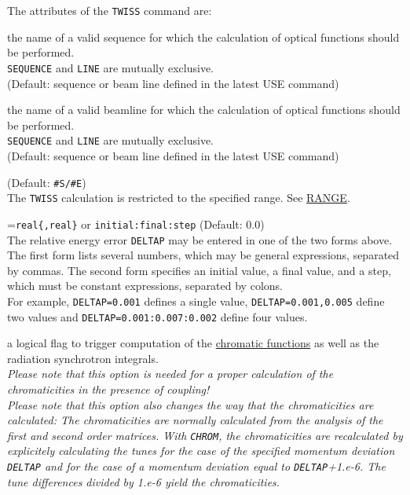 The  attributes of the {\tt TWISS} command are: 
\begin{madlist}
   the name of a valid sequence for
  which the calculation of optical functions should be performed. \\ 
  {\tt SEQUENCE} and {\tt LINE} are mutually exclusive.\\
  (Default: sequence or beam line defined in the latest USE command)

   the name of a valid beamline for which
  the calculation of optical functions should be performed. \\
  {\tt SEQUENCE} and {\tt LINE} are mutually exclusive.\\
  (Default: sequence or beam line defined in the latest USE command)
  
   (Default: {\tt \#S/\#E})\\
  The {\tt TWISS} calculation is restricted to the specified range.
  See \href{../Introduction/ranges.html#range}{RANGE}.  

  ={\tt real\{,real\}} or {\tt initial:final:step}
  (Default: 0.0)\\ 
  The relative energy error {\tt DELTAP} may be entered in one of the
  two forms above. \\ 
  The first form lists several numbers, which may be general expressions,
  separated by commas. The second form specifies an initial value, a final
  value, and a step, which must be constant expressions, separated by
  colons. \\
  For example, {\tt DELTAP=0.001} defines a single value, 
  {\tt DELTAP=0.001,0.005} define two values and 
  {\tt DELTAP=0.001:0.007:0.002} define four values. 


   a logical flag to trigger computation of the
  \hyperref[subsec:tables-chrom]{chromatic functions} as well as the radiation 
  synchrotron integrals. \\
  \textit{Please note that this option is needed for a proper
    calculation of the chromaticities in the presence of coupling!}\\
  \textit{Please note that this option also changes the way that the
    chromaticities are calculated: The chromaticities are normally
    calculated from the analysis of the first and second order
    matrices. With {\tt CHROM}, the chromaticities are recalculated by
    explicitely calculating the tunes for the case of the specified momentum
    deviation {\tt DELTAP} and for the case of a momentum deviation equal
    to {\tt DELTAP}+1.e-6. The tune differences divided by 1.e-6 yield the
    chromaticities.}


\end{madlist}
